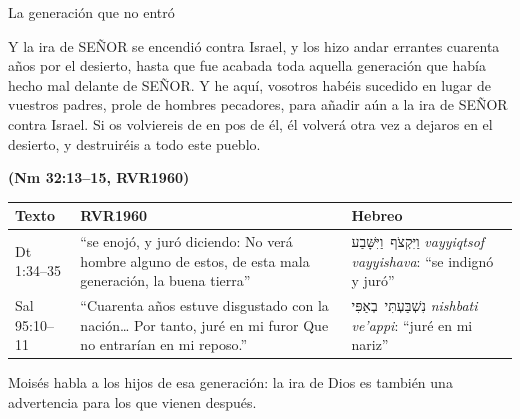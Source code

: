 \documentclass[hyperref={bookmarks=false},aspectratio=169]{beamer}
\newcommand{\heb}[1]{\mbox{\foreignlanguage{hebrew}{#1}}}
\newcommand{\SENOR}{S{\fontsize{0.78em}{1em}\selectfont EÑOR}}
\newcommand{\fuente}[1]{\par\hfill{\upshape\bfseries\footnotesize\textcolor{azul}{#1}}}
\begin{document}
\begin{frame}{La generación que no entró}
\begin{cita}Y la ira de \SENOR{} se encendió contra Israel, y los hizo andar errantes cuarenta años por el desierto, hasta que fue acabada toda aquella generación que había hecho mal delante de \SENOR. Y he aquí, vosotros habéis sucedido en lugar de vuestros padres, prole de hombres pecadores, para añadir aún a la ira de \SENOR{} contra Israel. Si os volviereis de en pos de él, él volverá otra vez a dejaros en el desierto, y destruiréis a todo este pueblo.\fuente{(Nm 32:13--15, RVR1960)}\end{cita}
\scriptsize\renewcommand{\arraystretch}{1.2}
\begin{tabular}{@{}>{\RaggedRight\arraybackslash}p{2.0cm}>{\RaggedRight\arraybackslash}p{6.0cm}>{\RaggedRight\arraybackslash}p{3.7cm}@{}}
\toprule
\textbf{Texto} & \textbf{RVR1960} & \textbf{Hebreo} \\ \midrule
Dt 1:34--35 & ``se enojó, y juró diciendo: No verá hombre alguno de estos, de esta mala generación, la buena tierra'' & \heb{וַיִּקְצֹף וַיִּשָּׁבַע} \emph{vayyiqtsof vayyishava}: ``se indignó y juró'' \\
Sal 95:10--11 & ``Cuarenta años estuve disgustado con la nación\ldots{} Por tanto, juré en mi furor Que no entrarían en mi reposo.'' & \heb{נִשְׁבַּעְתִּי בְאַפִּי} \emph{nishbati ve'appi}: ``juré en mi nariz'' \\
\bottomrule
\end{tabular}\par\smallskip
\small\RaggedRight Moisés habla a los hijos de esa generación: la ira de Dios es también una advertencia para los que vienen después.
\end{frame}
\end{document}
